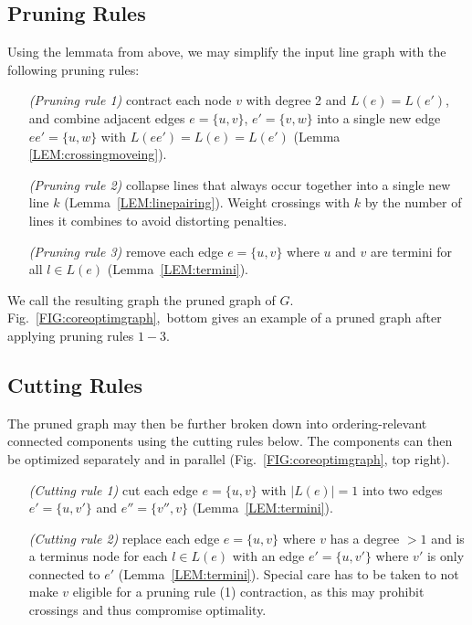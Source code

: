 \documentclass[format=acmsmall, review=false, screen=true]{acmart}
\begin{document}
\subsection{Pruning Rules}\label{SEC:pruning}

Using the lemmata from above, we may simplify the input line graph with the following pruning rules:
\begin{enumerate}[parsep=0.5mm, wide, labelwidth=0mm, itemindent=2.3mm]
	\setlength\itemsep{1pt}
	\item[\emph{(Pruning rule 1)}] contract each node $v$ with degree 2 and $L(e) = L(e')$, and combine adjacent edges $e = \{u, v\}$, $e' = \{v, w\}$ into a single new edge $ee' = \{u, w\}$ with $L(ee') = L(e) = L(e')$ (Lemma \ref{LEM:crossingmoveing}).
	\item[\emph{(Pruning rule 2)}] collapse lines that always occur together into a single new line $k$ (Lemma~\ref{LEM:linepairing}). Weight crossings with $k$ by the number of lines it combines to avoid distorting penalties.
	\item[\emph{(Pruning rule 3)}] remove each edge $e = \{u, v\}$ where $u$ and $v$ are termini for all $l \in L(e)$ (Lemma~\ref{LEM:termini}).
\end{enumerate}
\noindent

We call the resulting graph the pruned graph of $G$. Fig.~\ref{FIG:coreoptimgraph},~bottom gives an example of a pruned graph after applying pruning rules $1-3$.

\subsection{Cutting Rules}\label{SEC:cutting}

The pruned graph may then be further broken down into ordering-relevant connected components using the cutting rules below. The components can then be optimized separately and in parallel (Fig.~\ref{FIG:coreoptimgraph}, top right).
\begin{enumerate}[parsep=0.5mm, wide, labelwidth=0mm, itemindent=2.3mm]
	\setlength\itemsep{1pt}
    \item[\emph{(Cutting rule 1)}] cut each edge $e = \{u, v\}$ with $\left|L\left(e\right)\right| = 1$ into two edges $e' = \{u, v'\}$ and $e'' = \{v'', v\}$ (Lemma~\ref{LEM:termini}).
    \item[\emph{(Cutting rule 2)}] replace each edge $e = \{u, v\}$ where $v$ has a degree $>1$ and is a terminus node for each $l \in L(e)$ with an edge $e' = \{u, v'\}$ where $v'$ is only connected to $e'$ (Lemma~\ref{LEM:termini}). Special care has to be taken to not make $v$ eligible for a pruning rule (1) contraction, as this may prohibit crossings and thus compromise optimality.
\end{enumerate}
\end{document}
